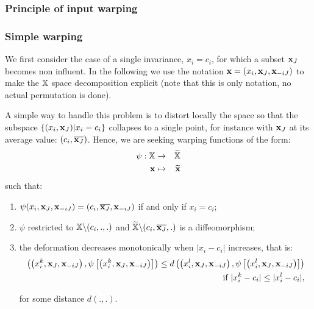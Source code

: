 	\subsubsection{Principle of input warping}
	
	\cite{snoek2014input,marmin2018warped}
	
	
	\subsubsection{Simple warping}
	We first consider the case of a single invariance, $x_i = c_i$, for which a subset $\mathbf{x}_J$ becomes non influent. 
	In the following we use the notation $\mathbf{x} = (x_i, \mathbf{x}_J, \mathbf{x}_{-iJ})$ to make the $\mathbb{X}$ space decomposition explicit (note that this is only notation, 
	no actual permutation is done).
	
	A simple way to handle this problem is to distort locally the space so that the subspace $\{(x_i, \mathbf{x}_J) | x_i = c_i\}$ collapses to a single point,
	for instance with $\mathbf{x}_J$ at its average value: $(c_i, \overline{\mathbf{x}_J})$.
	Hence, we are seeking warping functions of the form: 
	\begin{eqnarray*}
		\psi: \mathbb{X} &\rightarrow& \widetilde{\mathbb{X}} \\
		\mathbf{x} & \mapsto &  \widetilde{\mathbf{x}}
	\end{eqnarray*}
	such that:
	\begin{enumerate}
		\item $\psi(x_i, \mathbf{x}_J, \mathbf{x}_{-iJ}) = (c_i, \overline{\mathbf{x}_J}, \mathbf{x}_{-iJ})$ if and only if $x_i=c_i$;%
		\item $\psi$ restricted to $\mathbb{X} \backslash (c_i,.,.)$ and $\widetilde{\mathbb{X}} \backslash (c_i,\overline{\mathbf{x}_J},.)$ is a diffeomorphism;
		\item the deformation decreases monotonically when $\lvert x_i - c_i\rvert$ increases, that is: 
		\begin{eqnarray*}
			\left( \left(x_i^{k}, \mathbf{x}_J, \mathbf{x}_{-iJ} \right), \psi\left[\left(x_i^{k}, \mathbf{x}_J, \mathbf{x}_{-iJ}\right)\right] \right)\leq d \left( \left(x_i^{l}, \mathbf{x}_J, \mathbf{x}_{-iJ} \right), 
			\psi\left[\left(x_i^{l}, \mathbf{x}_J, \mathbf{x}_{-iJ}\right)\right]\right)  \\ \text{ if }\lvert x_i^{k}- c_i\rvert \leq \lvert x_i^{l}- c_i\rvert, 
		\end{eqnarray*}
		
		for some distance $d(.,.)$.
	\end{enumerate}
	
